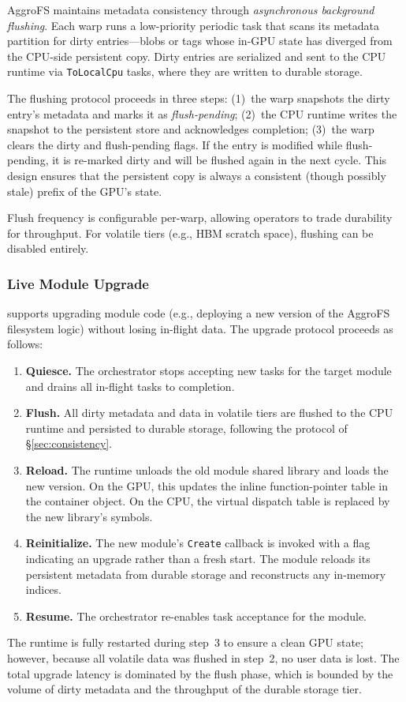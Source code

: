 AggroFS maintains metadata consistency through \emph{asynchronous
background flushing}.  Each warp runs a low-priority periodic task
that scans its metadata partition for dirty entries---blobs or tags
whose in-GPU state has diverged from the CPU-side persistent copy.
Dirty entries are serialized and sent to the CPU runtime via
\texttt{ToLocalCpu} tasks, where they are written to durable
storage.

The flushing protocol proceeds in three steps:
(1)~the warp snapshots the dirty entry's metadata and marks it
as \emph{flush-pending};
(2)~the CPU runtime writes the snapshot to the persistent store
and acknowledges completion;
(3)~the warp clears the dirty and flush-pending flags.
If the entry is modified while flush-pending, it is re-marked
dirty and will be flushed again in the next cycle.  This design
ensures that the persistent copy is always a consistent (though
possibly stale) prefix of the GPU's state.

Flush frequency is configurable per-warp, allowing operators to
trade durability for throughput.  For volatile tiers (e.g., HBM
scratch space), flushing can be disabled entirely.

\subsubsection{Live Module Upgrade}
\label{sec:live-upgrade}

\sysname{} supports upgrading module code (e.g., deploying a new
version of the AggroFS filesystem logic) without losing in-flight
data.  The upgrade protocol proceeds as follows:

\begin{enumerate}[nosep]
  \item \textbf{Quiesce.}  The orchestrator stops accepting new
    tasks for the target module and drains all in-flight tasks to
    completion.
  \item \textbf{Flush.}  All dirty metadata and data in volatile
    tiers are flushed to the CPU runtime and persisted to durable
    storage, following the protocol of \S\ref{sec:consistency}.
  \item \textbf{Reload.}  The runtime unloads the old module
    shared library and loads the new version.  On the GPU, this
    updates the inline function-pointer table in the container
    object.  On the CPU, the virtual dispatch table is replaced by
    the new library's symbols.
  \item \textbf{Reinitialize.}  The new module's \texttt{Create}
    callback is invoked with a flag indicating an upgrade rather
    than a fresh start.  The module reloads its persistent
    metadata from durable storage and reconstructs any in-memory
    indices.
  \item \textbf{Resume.}  The orchestrator re-enables task
    acceptance for the module.
\end{enumerate}

\noindent
The runtime is fully restarted during step~3 to ensure a clean GPU
state; however, because all volatile data was flushed in step~2, no
user data is lost.  The total upgrade latency is dominated by the
flush phase, which is bounded by the volume of dirty metadata and
the throughput of the durable storage tier.
